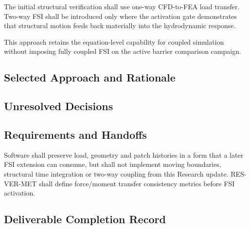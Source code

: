 The initial structural verification shall use one-way CFD-to-FEA load
transfer. Two-way FSI shall be introduced only where the activation
gate demonstrates that structural motion feeds back materially into
the hydrodynamic response.

This approach retains the equation-level capability for coupled
simulation without imposing fully coupled FSI on the active barrier
comparison campaign.

\subsection{Selected Approach and Rationale}
\label{sec:res-str-fsi-selected-approach}


\subsection{Unresolved Decisions}
\label{sec:res-str-fsi-unresolved-decisions}


\subsection{Requirements and Handoffs}
\label{sec:res-str-fsi-requirements}

Software shall preserve load, geometry and patch histories in a form
that a later FSI extension can consume, but shall not implement moving
boundaries, structural time integration or two-way coupling from this
Research update. RES-VER-MET shall define force/moment transfer
consistency metrics before FSI activation.

\subsection{Deliverable Completion Record}
\label{sec:res-str-fsi-completion-record}

%
%
%
